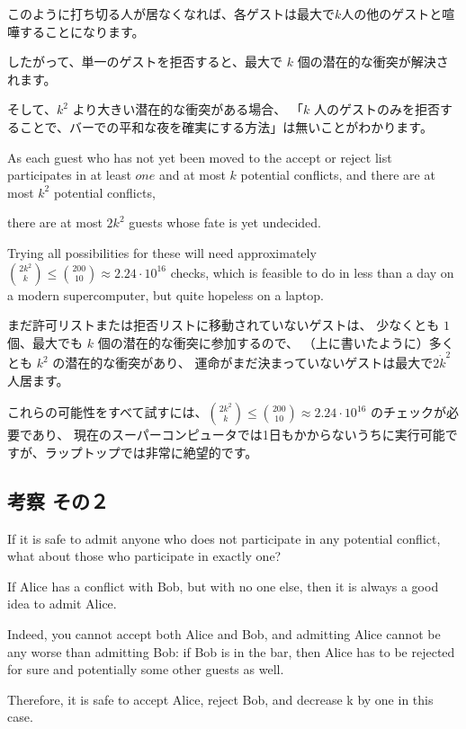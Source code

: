 \documentclass{jsarticle}
\begin{document}
このように打ち切る人が居なくなれば、各ゲストは最大で$k$人の他のゲストと喧嘩することになります。

したがって、単一のゲストを拒否すると、最大で $k$ 個の潜在的な衝突が解決されます。

そして、$k^2$ より大きい潜在的な衝突がある場合、
「$k$ 人のゲストのみを拒否することで、バーでの平和な夜を確実にする方法」は無いことがわかります。

\begin{screen}
As each guest who has not yet been moved to the accept or reject list participates in at least $one$ and at most $k$ potential conflicts, 
and there are at most $k^2$ potential conflicts,

there are at most $2k^2$ guests whose fate is yet undecided.

Trying all possibilities for these will need approximately
$\binom{2k^2}{k} \leq \binom{200}{10} \approx 2.24 \cdot 10^{16}$
checks, which is feasible to do in less than a day on a modern supercomputer, but quite hopeless on a laptop.
\end{screen}

まだ許可リストまたは拒否リストに移動されていないゲストは、
少なくとも $1$ 個、最大でも $k$ 個の潜在的な衝突に参加するので、
（上に書いたように）多くとも $k^2$ の潜在的な衝突があり、
運命がまだ決まっていないゲストは最大で$2 \dot k^2$人居ます。

これらの可能性をすべて試すには、$\binom{2k^2}{k} \leq \binom{200}{10} \approx 2.24 \cdot 10^{16}$ のチェックが必要であり、
現在のスーパーコンピュータでは1日もかからないうちに実行可能ですが、ラップトップでは非常に絶望的です。


\newpage

\subsection{考察 その２}
\begin{screen}
    If it is safe to admit anyone who does not participate in any potential conflict, what about those who participate in exactly one? 

    If Alice has a conflict with Bob, but with no one else, then it is always a good idea to admit Alice.
    
    Indeed, you cannot accept both Alice and Bob, and admitting Alice cannot be any worse than admitting Bob: if Bob is in the bar, then Alice has to be rejected for sure and potentially some other guests as well. 
    
    Therefore, it is safe to accept Alice, reject Bob, and decrease k by one in this case. 
    
\end{screen}
\end{document}
